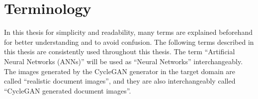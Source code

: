 \section{Terminology}\label{terminology}

In this thesis for simplicity and readability, many terms are explained beforehand for better understanding and to avoid confusion. The following terms described in this thesis are consistently used throughout this thesis. The term ``Artificial Neural Networks (\acp{ANN})'' will be used as ``Neural Networks'' interchangeably. The images generated by the \ac{CycleGAN} generator in the target domain are called ``realistic document images'', and they are also interchangeably called ``\ac{CycleGAN} generated document images''.















